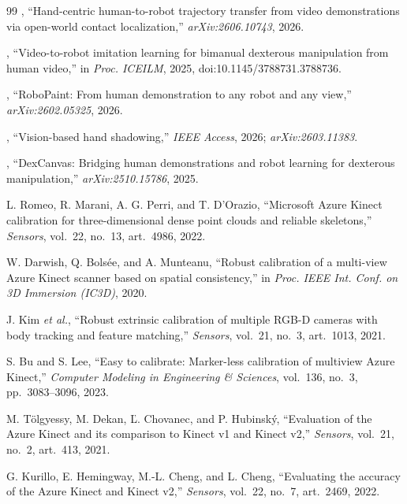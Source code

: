 \begin{thebibliography}{99}
\ph{[Authors]}, ``Hand-centric human-to-robot trajectory transfer from video
demonstrations via open-world contact localization,'' \emph{arXiv:2606.10743},
2026. 

\ph{[Authors]}, ``Video-to-robot imitation learning for bimanual dexterous
manipulation from human video,'' in \emph{Proc. ICEILM}, 2025,
doi:10.1145/3788731.3788736. 

\ph{[Authors]}, ``RoboPaint: From human demonstration to any robot and any
view,'' \emph{arXiv:2602.05325}, 2026. 

\ph{[Authors]}, ``Vision-based hand shadowing,'' \emph{IEEE Access}, 2026;
\emph{arXiv:2603.11383}. 

\ph{[Authors]}, ``DexCanvas: Bridging human demonstrations and robot learning
for dexterous manipulation,'' \emph{arXiv:2510.15786}, 2025.

L. Romeo, R. Marani, A. G. Perri, and T. D'Orazio, ``Microsoft Azure Kinect
calibration for three-dimensional dense point clouds and reliable skeletons,''
\emph{Sensors}, vol.~22, no.~13, art.~4986, 2022.

W. Darwish, Q. Bols\'{e}e, and A. Munteanu, ``Robust calibration of a
multi-view Azure Kinect scanner based on spatial consistency,'' in
\emph{Proc. IEEE Int. Conf. on 3D Immersion (IC3D)}, 2020.

J. Kim \emph{et al.}, ``Robust extrinsic calibration of multiple RGB-D cameras
with body tracking and feature matching,'' \emph{Sensors}, vol.~21, no.~3,
art.~1013, 2021.

S. Bu and S. Lee, ``Easy to calibrate: Marker-less calibration of multiview
Azure Kinect,'' \emph{Computer Modeling in Engineering \& Sciences},
vol.~136, no.~3, pp.~3083--3096, 2023.

M. T\"{o}lgyessy, M. Dekan, \v{L}. Chovanec, and P. Hubinsk\'{y}, ``Evaluation
of the Azure Kinect and its comparison to Kinect v1 and Kinect v2,''
\emph{Sensors}, vol.~21, no.~2, art.~413, 2021.

G. Kurillo, E. Hemingway, M.-L. Cheng, and L. Cheng, ``Evaluating the accuracy
of the Azure Kinect and Kinect v2,'' \emph{Sensors}, vol.~22, no.~7, art.~2469,
2022.


\end{thebibliography}
